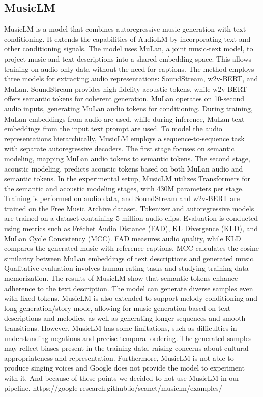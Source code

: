 \documentclass{article}
\begin{document}
\subsection{MusicLM}
MusicLM is a model that combines autoregressive music generation with text conditioning. It extends the capabilities of AudioLM by incorporating text and other conditioning signals. The model uses MuLan, a joint music-text model, to project music and text descriptions into a shared embedding space. This allows training on audio-only data without the need for captions.
The method employs three models for extracting audio representations: SoundStream, w2v-BERT, and MuLan. SoundStream provides high-fidelity acoustic tokens, while w2v-BERT offers semantic tokens for coherent generation. MuLan operates on 10-second audio inputs, generating MuLan audio tokens for conditioning. During training, MuLan embeddings from audio are used, while during inference, MuLan text embeddings from the input text prompt are used.
To model the audio representations hierarchically, MusicLM employs a sequence-to-sequence task with separate autoregressive decoders. The first stage focuses on semantic modeling, mapping MuLan audio tokens to semantic tokens. The second stage, acoustic modeling, predicts acoustic tokens based on both MuLan audio and semantic tokens.
In the experimental setup, MusicLM utilizes Transformers for the semantic and acoustic modeling stages, with 430M parameters per stage. Training is performed on audio data, and SoundStream and w2v-BERT are trained on the Free Music Archive dataset. Tokenizer and autoregressive models are trained on a dataset containing 5 million audio clips.
Evaluation is conducted using metrics such as Fréchet Audio Distance (FAD), KL Divergence (KLD), and MuLan Cycle Consistency (MCC). FAD measures audio quality, while KLD compares the generated music with reference captions. MCC calculates the cosine similarity between MuLan embeddings of text descriptions and generated music. Qualitative evaluation involves human rating tasks and studying training data memorization.
The results of MusicLM show that semantic tokens enhance adherence to the text description. The model can generate diverse samples even with fixed tokens. MusicLM is also extended to support melody conditioning and long generation/story mode, allowing for music generation based on text descriptions and melodies, as well as generating longer sequences and smooth transitions.
However, MusicLM has some limitations, such as difficulties in understanding negations and precise temporal ordering. The generated samples may reflect biases present in the training data, raising concerns about cultural appropriateness and representation. Furthermore, MusicLM is not able to produce singing voices and Google does not provide the model to experiment with it. And because of these points we decided to not use MusicLM in our pipeline.
https://google-research.github.io/seanet/musiclm/examples/
\end{document}
